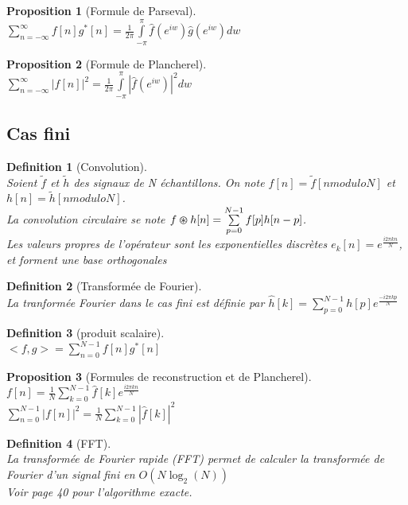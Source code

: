 \documentclass[a4paper]{article}
\newtheorem*{prop}{Proposition}
\newtheorem*{definition}{Definition}
\renewcommand{\(}{\left(}
\renewcommand{\)}{\right)}
\begin{document}
\begin{prop}[Formule de Parseval]~\\
  $\sum\limits_{n=-\infty}^{\infty}f[n]g^*[n] = \frac{1}{2\pi}\int\limits_{-\pi}^{\pi}\hat{f}(e^{iw})\hat{g}(e^{iw})dw$
\end{prop}

\begin{prop}[Formule de Plancherel]~\\
  $\sum\limits_{n=-\infty}^\infty |f[n]|^2 = \frac{1}{2\pi}\int\limits_{-\pi}^{\pi} |\hat{f}(e^{iw})|^2dw$
\end{prop}

\subsection{Cas fini}

\begin{definition}[Convolution]~\\
  Soient $\tilde{f}$ et $\tilde{h}$ des signaux de N échantillons. On note
  $f[n]=\tilde{f}[n modulo N]$ et $h[n]=\tilde{h}[n modulo N]$.\\
  La convolution circulaire se note $f \varoast h[n] = \sum\limits_{p=0}^{N-1}
  f[p]h[n-p]$.\\
  Les valeurs propres de l'opérateur sont les exponentielles discrètes
  $e_k[n] = e^{\frac{i2\pi kn}{N}}$, et forment une base orthogonales
\end{definition}

\begin{definition}[Transformée de Fourier]~\\
  La tranformée Fourier dans le cas fini est définie par
  $\hat{h}[k]=\sum\limits_{p=0}^{N-1}h[p]e^{\frac{-i2\pi kp}{N}}$
\end{definition}

\begin{definition}[produit scalaire]~\\
  $<f,g> = \sum\limits_{n=0}^{N-1}f[n]g^*[n]$
\end{definition}

\begin{prop}[Formules de reconstruction et de Plancherel]~\\
  $f[n] = \frac{1}{N} \sum\limits_{k=0}^{N-1}\hat{f}[k]e^{\frac{i2\pi kn}{N}}$\\
  $\sum\limits_{n=0}^{N-1}|f[n]|^2 = \frac{1}{N}\sum\limits_{k=0}^{N-1}|\hat{f}[k]|^2$
\end{prop}

\begin{definition}[FFT]~\\
  La transformée de Fourier rapide (FFT) permet de calculer la transformée de
  Fourier d'un signal fini en $O(N \log_2(N))$\\
  Voir page 40 pour l'algorithme exacte.
\end{definition}
\end{document}
